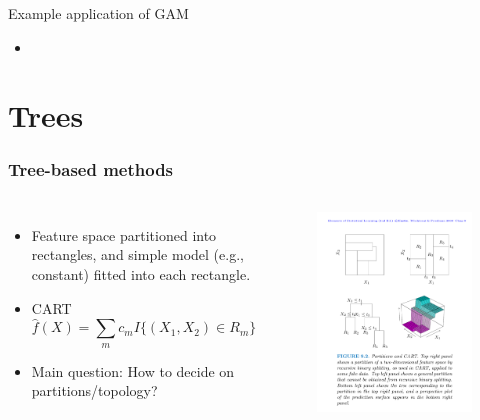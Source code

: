 \documentclass{beamer}
\begin{document}
\begin{frame}{Example application of GAM}
    \begin{itemize}
        \item 
    \end{itemize}
\end{frame}


\section{Trees}

\begin{frame}
\frametitle{Tree-based methods}
\begin{columns}
\begin{itemize}
        \item Feature space partitioned into rectangles, and simple model (e.g., constant) fitted into each rectangle.
        \item CART 
        \begin{equation*}
            \hat{f}(X) = \sum_{m} c_m I\{(X_1,X_2) \in R_m\}
        \end{equation*}
        \item Main question: How to decide on partitions/topology?
\end{itemize}
\begin{figure}
            \centering
            \includegraphics[width=\textwidth]{figures/cart.pdf}
        \end{figure}
\end{columns}
\end{frame}
\end{document}
